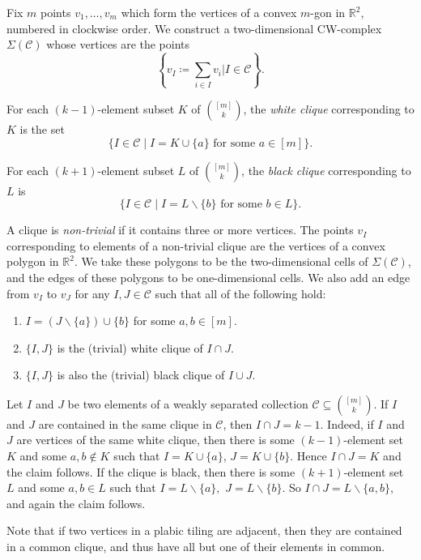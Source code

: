 \documentclass[ALCO,ThmDefs,Unicode,epreuves]{cedram}
\begin{document}
Fix $m$ points $v_1,\ldots,v_m$ which form the vertices of a convex $m$-gon in $\mathbb{R}^2$, numbered in clockwise order. We construct a two-dimensional CW-complex $\Sigma(\mathcal{C})$ whose vertices are the points 
\[\left\{v_I \coloneqq \sum_{i \in I} v_i \mathrel{\Bigg|} I \in \mathcal{C}\right\}.\]

For each $(k-1)$-element subset $K$ of $\binom{[m]}{k}$, the \emph{white clique} corresponding to $K$ is the set 
\[
\{I \in \mathcal{C} \mid I = K \cup \{a\} \text{ for some } a \in [m]\}.
\]

For each $(k+1)$-element subset $L$ of $\binom{[m]}{k}$, the \emph{black clique} corresponding to $L$ is \[\{I \in \mathcal{C} \mid I = L \backslash \{b\} \text{ for some } b \in L\}.\]

A clique is \emph{non-trivial} if it contains three or more vertices. The points $v_I$ corresponding to elements of a non-trivial clique are the vertices of a convex polygon in $\mathbb{R}^2$. We take these polygons to be the two-dimensional cells of $\Sigma(\mathcal{C})$, and the edges of these polygons to be one-dimensional cells.
We also add an edge from $v_I$ to $v_J$ for any $I, J \in \mathcal{C}$ such that all of the following hold:
\begin{enumerate}
\item $I = (J \backslash \{a\}) \cup \{b\}$ for some $a, b \in [m]$.
\item $\{I,J\}$ is the (trivial) white clique of $I \cap J.$
\item $\{I, J\}$ is also the (trivial) black clique of $I \cup J$.
\end{enumerate}

\begin{rema}
\label{mostly_same}
Let $I$ and $J$ be two elements of a weakly separated collection $\mathcal{C} \subseteq \binom{[m]}{k}$. If $I$ and $J$ are contained in the same clique in $\mathcal{C}$, then $I \cap J = k-1$. Indeed, if $I$ and $J$ are vertices of the same white clique, then there is some $(k-1)$-element set $K$ and some $a, b \not\in K$ such that $I = K \cup \{a\}$, $J = K \cup \{b\}$. Hence $I \cap J = K$ and the claim follows. If the clique is black, then there is some $(k+1)$-element set $L$ and some $a,b \in L$ such that $I = L \backslash \{a\},$ $J = L \backslash \{b\}$. So $I \cap J = L \backslash \{a,b\}$, and again the claim follows.

Note that if two vertices in a plabic tiling are adjacent, then they are contained in a common clique, and thus have all but one of their elements in common.
\end{rema}
\end{document}
